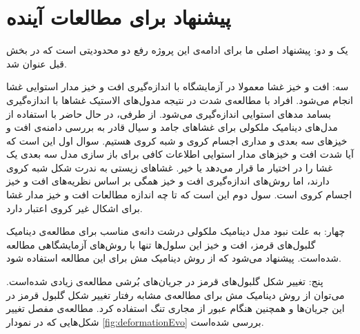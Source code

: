 %
%
\section{
پیشنهاد برای مطالعات آینده
}

یک و دو: پیشنهاد اصلی ما برای ادامه‌ی این پروژه رفع دو محدودیتی است که در بخش قبل عنوان شد. 

سه: افت و خیز غشا معمولا در آزمایشگاه با اندازه‌گیری افت و خیز مدار استوایی غشا انجام می‌شود. افراد با مطالعه‌ی شدت‌ در نتیجه مدول‌های الاستیک غشاها با اندازه‌گیری بسامد مد‌های استوایی اندازه‌گیری می‌شود. از طرفی، در حال حاضر با استفاده از مدل‌های دینامیک ملکولی برای غشاها‌ی جامد و سیال قادر به بررسی دامنه‌ی افت‌ و خیز‌های سه بعدی و مداری اجسام کروی و شبه کروی هستیم. سوال اول این است که آیا شدت افت و خیز‌های مدار استوایی اطلاعات کافی برای باز سازی مدل سه بعدی یک غشا را در اختیار ما قرار می‌دهد یا خیر. غشا‌های زیستی به ندرت شکل شبه کروی دارند، اما روش‌های اندازه‌گیری افت و خیز همگی بر اساس نظریه‌های افت و خیز اجسام کروی است. سول دوم این است که تا چه اندازه مطالعات افت و خیز مدار غشا برای اشکال غیر کروی اعتبار دارد.

چهار: به علت نبود مدل دینامیک ملکولی درشت دانه‌ی مناسب برای مطالعه‌ی دینامیک گلبول‌های قرمز، افت و خیز این سلول‌ها تنها با روش‌های آزمایشگاهی مطالعه شده‌است. پیشنهاد می‌شود که از روش دینامیک مش برای این مطالعه استفاده شود. 

پنج: تغییر شکل گلبول‌های قرمز در جریان‌های بُرشی مطالعه‌ی زیادی شده‌است. می‌توان از روش دینامیک مش  برای مطالعه‌ی مشابه رفتار تغییر شکل گلبول قرمز در این جریان‌ها و همچنین هنگام عبور از مجاری تنگ استفاده کرد. مطالعه‌ی مفصل تغییر شکل‌هایی که در نمودار
\ref{fig:deformationEvo}
بررسی شده‌است. 








